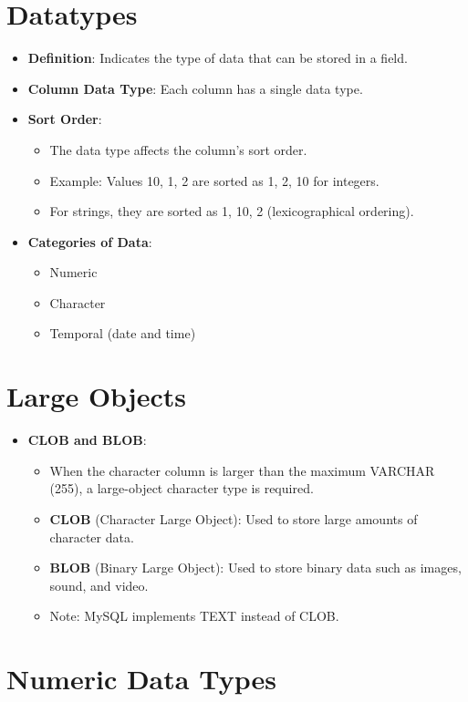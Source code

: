 \documentclass{article}
\begin{document}
\section{Datatypes}

\begin{itemize}
    \item \textbf{Definition}: Indicates the type of data that can be stored in a field.
    \item \textbf{Column Data Type}: Each column has a single data type.
    \item \textbf{Sort Order}:
    \begin{itemize}
        \item The data type affects the column's sort order.
        \item Example: Values 10, 1, 2 are sorted as 1, 2, 10 for integers.
        \item For strings, they are sorted as 1, 10, 2 (lexicographical ordering).
    \end{itemize}
    \item \textbf{Categories of Data}:
    \begin{itemize}
        \item Numeric
        \item Character
        \item Temporal (date and time)
    \end{itemize}
\end{itemize}
\section{Large Objects}

\begin{itemize}
    \item \textbf{CLOB and BLOB}:
    \begin{itemize}
        \item When the character column is larger than the maximum VARCHAR (255), a large-object character type is required.
        \item \textbf{CLOB} (Character Large Object): Used to store large amounts of character data.
        \item \textbf{BLOB} (Binary Large Object): Used to store binary data such as images, sound, and video.
        \item Note: MySQL implements TEXT instead of CLOB.
    \end{itemize}
\end{itemize}
\section{Numeric Data Types}
\end{document}
